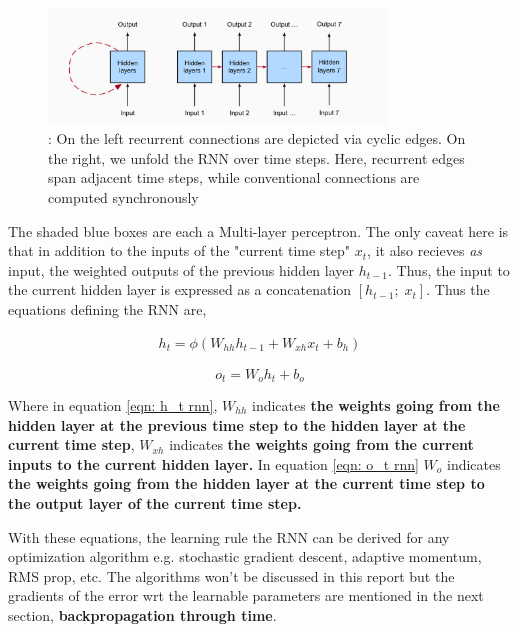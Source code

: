 \documentclass[12pt, letterpaper]{article}
\begin{document}
\begin{figure}[htpb]
    \centering
    \includegraphics[width=0.8\textwidth]{d2l_ai_rnn_v1.png}
    \caption{\cite{zhang2023dive}: On the left recurrent connections are depicted via cyclic edges. 
    On the right, we unfold the RNN over time steps. Here, recurrent edges span 
    adjacent time steps, while conventional connections are computed synchronously}
    \label{fig: rnns v1}
\end{figure}

The shaded blue boxes are each a Multi-layer perceptron. The only caveat here is that in addition to the
inputs of the "current time step" $x_t$, it also recieves \textit{as} input, the weighted outputs of 
the previous hidden layer $h_{t-1}$. Thus, the input to the current hidden layer is expressed as a 
concatenation $[h_{t-1};\;x_t]$. Thus the equations defining the RNN are,

\begin{align}
    h_t = \phi(W_{hh} h_{t-1} + W_{xh} x_t + b_h)
    \label{eqn: h_t rnn}
\end{align}

\begin{equation}
    o_t = W_o h_t + b_o
    \label{eqn: o_t rnn}
\end{equation}

Where in equation \ref{eqn: h_t rnn}, $W_{hh}$ indicates \textbf{the weights going from the hidden layer at the previous time step to the 
hidden layer at the current time step}, $W_{xh}$ indicates \textbf{the weights going from the current 
inputs to the current hidden layer.} In equation \ref{eqn: o_t rnn} $W_o$ indicates \textbf{the weights going from
the hidden layer at the current time step to the output layer of the current time step.}

With these equations, the learning rule the RNN can be derived for any optimization algorithm e.g.
stochastic gradient descent, adaptive momentum, RMS prop, etc. The algorithms won't be discussed in 
this report but the gradients of the error wrt the learnable parameters are mentioned
in the next section, \textbf{backpropagation through time}.
\end{document}
